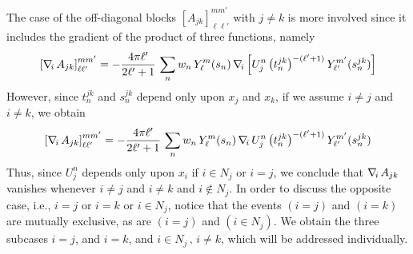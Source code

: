 The case of the off-diagonal blocks ${[ A_{jk}]}_{\ell \ell'}^{mm'}$ with $j \not=k$ is more involved since it includes the gradient of the product of three functions, namely
\begin{equation}\label{eq:7}
{[\nabla_{\!i}\,A_{jk}]}_{\ell \ell'}^{mm'} = -  \frac{4 \pi \ell'}{2 \ell'+1} \, \sum_{n} w_n\, Y_\ell^m(s_n) \,\nabla_{\!i}\, \Big[ U_j^n  \,  \big( t_n^{jk}\big)^{-(\ell'+1)} \, Y_{\ell'}^{m'} (s_n^{jk}) \Big]
\end{equation}
However, since $t_n^{jk}$ and $s_n^{jk}$ depend only upon $x_j$ and $x_k$, if we assume $i \not=j$ and $i\not=k$, we obtain
\begin{equation}\label{eq:8}
{[\nabla_{\!i}\,A_{jk}]}_{\ell \ell'}^{mm'} = -  \frac{4 \pi \ell'}{2 \ell'+1} \, \sum_{n} w_n\, Y_\ell^m(s_n) \,\nabla_{\!i}\, U_j^n  \,  \big( t_n^{jk}\big)^{-(\ell'+1)} \, Y_{\ell'}^{m'} (s_n^{jk})
\end{equation}
Thus, since $U_j^n$ depends only upon $x_i$ if $i \in N_j$ or $i=j$, we conclude that $\nabla_{\!i}\, A_{jk}$ vanishes whenever $i \not= j$ and $i \not=k$ and $i \not\in N_j$. In order to discuss the opposite case, i.e., $i = j$ or $i =k$ or $i \in N_j$, notice that the events $(i = j)$ and $(i = k)$ are mutually exclusive, as are $(i = j)$ and $(i \in N_j)$. We obtain the three subcases $i = j$, and $i = k$, and $i \in N_j \, , \, i \not= k$, which will be addressed individually.

